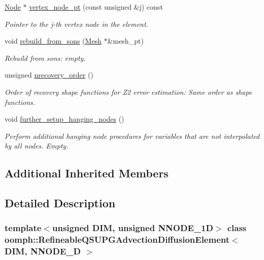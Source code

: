 \begin{DoxyCompactItemize}
\hyperlink{classoomph_1_1Node}{Node} $\ast$ \hyperlink{classoomph_1_1RefineableQSUPGAdvectionDiffusionElement_ab7a06dc6cb7993c7a42f3c52ea4a01b3}{vertex\+\_\+node\+\_\+pt} (const unsigned \&j) const
\begin{DoxyCompactList}\small\item\em Pointer to the j-\/th vertex node in the element. \end{DoxyCompactList}\item 
void \hyperlink{classoomph_1_1RefineableQSUPGAdvectionDiffusionElement_a084f176c97f1f8d024c7c2025e60cec9}{rebuild\+\_\+from\+\_\+sons} (\hyperlink{classoomph_1_1Mesh}{Mesh} $\ast$\&mesh\+\_\+pt)
\begin{DoxyCompactList}\small\item\em Rebuild from sons\+: empty. \end{DoxyCompactList}\item 
unsigned \hyperlink{classoomph_1_1RefineableQSUPGAdvectionDiffusionElement_a9b52030e939258716797d985a64671ce}{nrecovery\+\_\+order} ()
\begin{DoxyCompactList}\small\item\em Order of recovery shape functions for Z2 error estimation\+: Same order as shape functions. \end{DoxyCompactList}\item 
void \hyperlink{classoomph_1_1RefineableQSUPGAdvectionDiffusionElement_ad62112c2898ec92c7d4ffe323a801688}{further\+\_\+setup\+\_\+hanging\+\_\+nodes} ()
\begin{DoxyCompactList}\small\item\em Perform additional hanging node procedures for variables that are not interpolated by all nodes. Empty. \end{DoxyCompactList}\end{DoxyCompactItemize}
\subsection*{Additional Inherited Members}


\subsection{Detailed Description}
\subsubsection*{template$<$unsigned D\+IM, unsigned N\+N\+O\+D\+E\+\_\+1D$>$\newline
class oomph\+::\+Refineable\+Q\+S\+U\+P\+G\+Advection\+Diffusion\+Element$<$ D\+I\+M, N\+N\+O\+D\+E\+\_\+D $>$}

